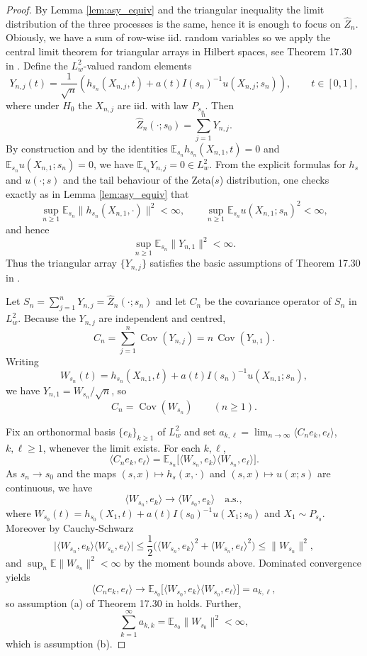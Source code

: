 \documentclass{article}
\theoremstyle{thm}
\theoremstyle{def}
\begin{document}
\begin{proof}
By Lemma \ref{lem:asy_equiv} and the triangular inequality the limit distribution of the three processes is the same, hence it is enough to focus on $\widehat{Z}_n$. Obiously, we have a sum of row-wise iid. random variables so we apply the central limit theorem for triangular arrays in Hilbert spaces, see Theorem 17.30 in \cite{H:2024}. Define the $L_w^2$-valued random
elements
\[
  Y_{n,j}(t)
  = \frac1{\sqrt n}\left(h_{s_n}(X_{n,j},t)+a(t)I(s_n)^{-1}u(X_{n,j};s_n)\right),
  \qquad t\in[0,1],
\]
where under $H_0$ the $X_{n,j}$ are iid. with law $P_{s_n}$. Then
\[
  \widehat Z_n(\cdot;s_0)
  = \sum_{j=1}^n Y_{n,j}.
\]
By construction and by the identities
$\mathbb E_{s_n}h_{s_n}(X_{n,1},t)=0$ and
$\mathbb E_{s_n}u(X_{n,1};s_n)=0$, we have
$\mathbb E_{s_n}Y_{n,j}=0\in L^2_w$.
From the explicit formulas for $h_s$ and $u(\cdot;s)$ and the tail behaviour
of the Zeta($s$) distribution, one checks exactly as in Lemma \ref{lem:asy_equiv} that
\[
  \sup_{n\ge1}\mathbb E_{s_n}\|h_{s_n}(X_{n,1},\cdot)\|^2<\infty,
  \qquad
  \sup_{n\ge1}\mathbb E_{s_n}u(X_{n,1};s_n)^2<\infty,
\]
and hence
\[
  \sup_{n\ge1}\mathbb E_{s_n}\|Y_{n,1}\|^2<\infty.
\]
Thus the triangular array $\{Y_{n,j}\}$ satisfies the basic assumptions of
Theorem 17.30 in \cite{H:2024}.

Let $S_n=\sum_{j=1}^n Y_{n,j}=\widehat Z_n(\cdot;s_n)$ and let $C_n$ be the
covariance operator of $S_n$ in $L^2_w$. Because the $Y_{n,j}$ are
independent and centred,
\[
  C_n
  = \sum_{j=1}^n \operatorname{Cov}(Y_{n,j})
  = n\,\operatorname{Cov}(Y_{n,1}).
\]
Writing
\[
  W_{s_n}(t)
  = h_{s_n}(X_{n,1},t)+a(t)I(s_n)^{-1}u(X_{n,1};s_n),
\]
we have $Y_{n,1}=W_{s_n}/\sqrt n$, so
\[
  C_n = \operatorname{Cov}(W_{s_n})\qquad(n\ge1).
\]

Fix an orthonormal basis $\{e_k\}_{k\ge1}$ of $L^2_w$ and set $a_{k,\ell}
   = \lim_{n\to\infty} \langle C_n e_k,e_\ell\rangle$, $k,\ell\ge1$,
whenever the limit exists. For each $k,\ell$,
\[
  \langle C_n e_k,e_\ell\rangle
  = \mathbb E_{s_n}\big[\langle W_{s_n},e_k\rangle
                       \langle W_{s_n},e_\ell\rangle\big].
\]
As $s_n\to s_0$ and the maps $(s,x)\mapsto h_s(x,\cdot)$ and
$(s,x)\mapsto u(x;s)$ are continuous, we have
\[
  \langle W_{s_n},e_k\rangle
  \xrightarrow{\;\;}\langle W_{s_0},e_k\rangle
  \quad\text{a.s.},
\]
where $W_{s_0}(t)=h_{s_0}(X_1,t)+a(t)I(s_0)^{-1}u(X_1;s_0)$ and
$X_1\sim P_{s_0}$. Moreover by Cauchy-Schwarz
\[
  \big|\langle W_{s_n},e_k\rangle
        \langle W_{s_n},e_\ell\rangle\big|
  \le \frac12\big(\langle W_{s_n},e_k\rangle^2
                  +\langle W_{s_n},e_\ell\rangle^2\big)
  \le \|W_{s_n}\|^2,
\]
and $\sup_n \mathbb E\|W_{s_n}\|^2<\infty$ by the moment bounds
above. Dominated convergence yields
\[
  \langle C_n e_k,e_\ell\rangle
   \longrightarrow
   \mathbb E_{s_0}\big[\langle W_{s_0},e_k\rangle
                      \langle W_{s_0},e_\ell\rangle\big]
   = a_{k,\ell},
\]
so assumption (a) of Theorem 17.30 in \cite{H:2024} holds. Further,
\[
  \sum_{k=1}^\infty a_{k,k}
  = \mathbb E_{s_0}\|W_{s_0}\|^2<\infty,
\]
which is assumption (b).


\end{proof}
\end{document}
